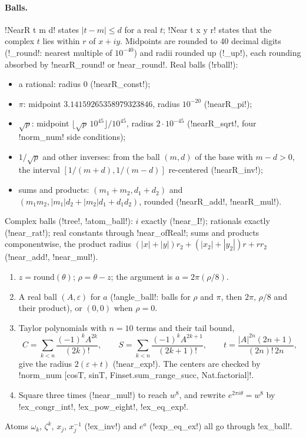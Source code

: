 {{{\paragraph{Balls.} \lexlean!NearR t m d! states $|t - m| \le d$ for a real $t$; \lexlean!Near t x y r!
states that the complex $t$ lies within $r$ of $x+iy$. Midpoints are rounded to 40 decimal
digits (\lexpy!_round!: nearest multiple of $10^{-40}$) and radii rounded up (\lexpy!_up!), each
rounding absorbed by \lexlean!nearR_round! or \lexlean!near_round!. Real balls (\lexpy!rball!):
\begin{itemize}
\item a rational: radius 0 (\lexlean!nearR_const!);
\item $\pi$: midpoint $3.14159265358979323846$, radius $10^{-20}$ (\lexlean!nearR_pi!);
\item $\sqrt p$: midpoint $\lfloor\sqrt{p}\,10^{45}\rfloor/10^{45}$, radius $2\cdot10^{-45}$
(\lexlean!nearR_sqrt!, four \lexlean!norm_num! side conditions);
\item $1/\sqrt p$ and other inverses: from the ball $(m,d)$ of the base with $m-d>0$, the interval
$[1/(m+d), 1/(m-d)]$ re-centered (\lexlean!nearR_inv!);
\item sums and products: $(m_1+m_2, d_1+d_2)$ and $(m_1m_2, |m_1|d_2+|m_2|d_1+d_1d_2)$, rounded
(\lexlean!nearR_add!, \lexlean!nearR_mul!).
\end{itemize}
Complex balls (\lexpy!tree!, \lexpy!atom_ball!): $i$ exactly (\lexlean!near_I!); rationals exactly
(\lexlean!near_rat!); real constants through \lexlean!near_ofReal!; sums and products componentwise,
the product radius $(|x|+|y|)r_2 + (|x_2|+|y_2|)r + rr_2$ (\lexlean!near_add!, \lexlean!near_mul!).

\begin{algorithm}\label{alg:lean-export-exball}
\begin{enumerate}
\item $z = \mathrm{round}(\theta)$; $\rho = \theta - z$; the argument is $a = 2\pi(\rho/8)$.
\item A real ball $(A, \varepsilon)$ for $a$ (\lexpy!angle_ball!: balls for $\rho$ and $\pi$, then
$2\pi$, $\rho/8$ and their product), or $(0,0)$ when $\rho=0$.
\item Taylor polynomials with $n=10$ terms and their tail bound,
\[
C = \sum_{k<n}\frac{(-1)^kA^{2k}}{(2k)!},\qquad
S = \sum_{k<n}\frac{(-1)^kA^{2k+1}}{(2k+1)!},\qquad
t = \frac{|A|^{2n}(2n+1)}{(2n)!\,2n},
\]
give the radius $2(\varepsilon + t)$ (\lexlean!near_exp!). The centers are checked by
\lexlean!norm_num [cosT, sinT, Finset.sum_range_succ, Nat.factorial]!.
\item Square three times (\lexlean!near_mul!) to reach $w^{8}$, and rewrite
$e^{2\pi i\theta} = w^{8}$ by \lexlean!ex_congr_int!, \lexlean!ex_pow_eight!, \lexlean!ex_eq_exp!.
\end{enumerate}
\end{algorithm}
Atoms $\omega_k$, $\zeta^{k}$, $x_j$, $x_j^{-1}$ (\lexlean!ex_inv!) and $e^{a}$ (\lexlean!exp_eq_ex!) all go
through \lexpy!ex_ball!.

}}}

